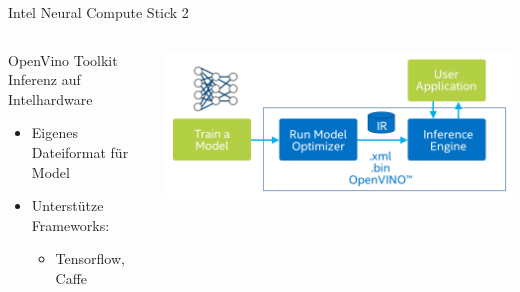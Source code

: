 \begin{frame}{Intel Neural Compute Stick 2}
{\begin{columns}[T]
\begin{block}{OpenVino Toolkit}
            Inferenz auf Intelhardware
            \begin{itemize}
                \item Eigenes Dateiformat für Model
                \item Unterstütze Frameworks:
                \begin{itemize}
                    \item  Tensorflow, Caffe
                \end{itemize}
            \end{itemize}
        \end{block}
            \includegraphics[width=\textwidth]{Bilder/open_vino_workflow_steps.png}
        \end{columns}

    }
        
\end{frame}